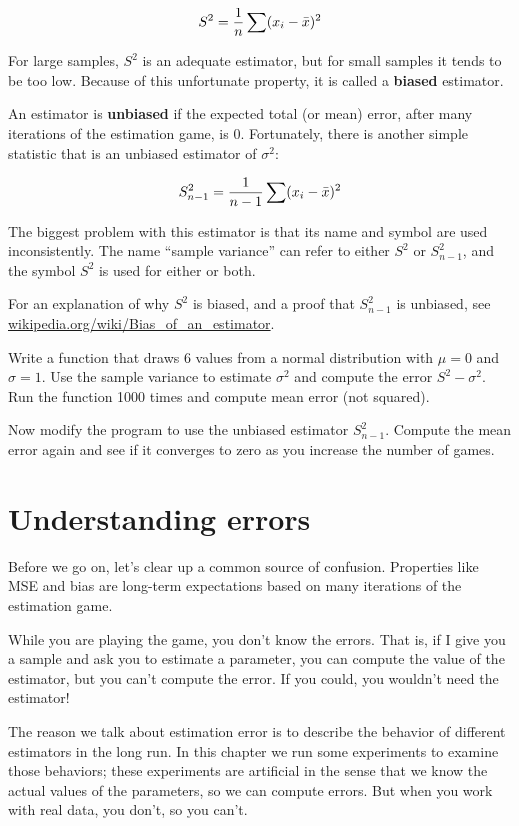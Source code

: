 \documentclass[12pt]{book}
\begin{document}
\[ S^2 = \frac{1}{n} \sum (x_i - \bar{x})^2 \] 

For large samples, $S^2$ is an adequate estimator, but for small
samples it tends to be too low.  Because of this unfortunate
property, it is called a {\bf biased} estimator.

An estimator is {\bf unbiased} if the expected total (or mean) error,
after many iterations of the estimation game, is 0.
Fortunately, there is another simple statistic that is an unbiased
estimator of $\sigma^2$:

\[ S_{n-1}^2 = \frac{1}{n-1} \sum (x_i - \bar{x})^2 \] 

The biggest problem with this estimator is that its name and symbol
are used inconsistently.  The name ``sample variance'' can refer to
either $S^2$ or $S_{n-1}^2$, and the symbol $S^2$ is used
for either or both.

For an explanation of why $S^2$ is biased, and a proof that
$S_{n-1}^2$ is unbiased, see
\url{wikipedia.org/wiki/Bias_of_an_estimator}.

\begin{ex}

Write a function that draws 6 values from a normal distribution with
$\mu=0$ and $\sigma=1$.  Use the sample variance to estimate
$\sigma^2$ and compute the error $S^2 - \sigma^2$.  Run the function 1000
times and compute mean error (not squared).

Now modify the program to use the unbiased estimator $S_{n-1}^2$.
Compute the mean error again and see if it converges to zero as you
increase the number of games.

\end{ex}


\section{Understanding errors}

Before we go on, let's clear up a common source of confusion.
Properties like MSE and bias are long-term expectations based on
many iterations of the estimation game.

While you are playing the game, you don't know the errors.  That is,
if I give you a sample and ask you to estimate a parameter, you
can compute the value of the estimator, but you can't compute the
error.  If you could, you wouldn't need the estimator!

The reason we talk about estimation error is to describe the behavior
of different estimators in the long run.  In this chapter we run some
experiments to examine those behaviors; these experiments are
artificial in the sense that we know the actual values of the
parameters, so we can compute errors.  But when you work with
real data, you don't, so you can't.
\end{document}
